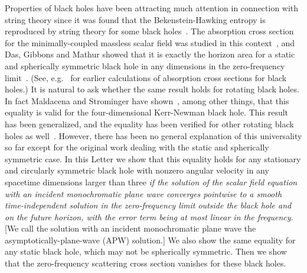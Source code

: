 \documentclass[a4paper,12pt]{article}
\begin{document}
Properties of black holes have been attracting much attention
in connection with string theory since it was found that the Bekenstein-Hawking
entropy is reproduced by string theory for some black holes~\cite{SV}.
The absorption cross section for the minimally-coupled massless scalar field
was studied in this context~\cite{DM1,DM2,GK,MS1}, and 
Das, Gibbons and Mathur showed that it is exactly the horizon area for
a static and spherically symmetric black hole in any dimensions 
in the zero-frequency
limit~\cite{DGM}. (See, e.g.~\cite{Staro,Gib,Pag,Unr} for earlier calculations
of absorption cross sections for black holes.) 
It is natural to ask whether the same result holds for rotating black holes.
In fact Maldacena and Strominger have shown~\cite{MS}, among other things,
that this equality 
is valid for the four-dimensional Kerr-Newman black hole. 
This result has been generalized, and the equality has been
verified for 
other rotating black holes as well~\cite{CL1,CL2,GH}. 
However, there has been no general explanation of
this universality so far except for the original work
dealing with the static and spherically symmetric case. 
In this Letter we show that this equality holds
for any stationary and circularly symmetric black hole
with nonzero angular velocity
in any spacetime dimensions larger than three
{\it if the solution of the scalar field equation
with an incident monochromatic plane wave 
converges pointwise to a smooth
time-independent solution in the zero-frequency
limit outside the black hole and on the future horizon, with the error 
term being at most linear in the frequency}.
[We call the solution with an incident monochromatic plane wave
the asymptotically-plane-wave (APW) solution.]
We also show the same equality for any static black hole, which may not
be spherically symmetric.  Then we show that the
zero-frequency scattering cross section vanishes for these black holes.
\end{document}
